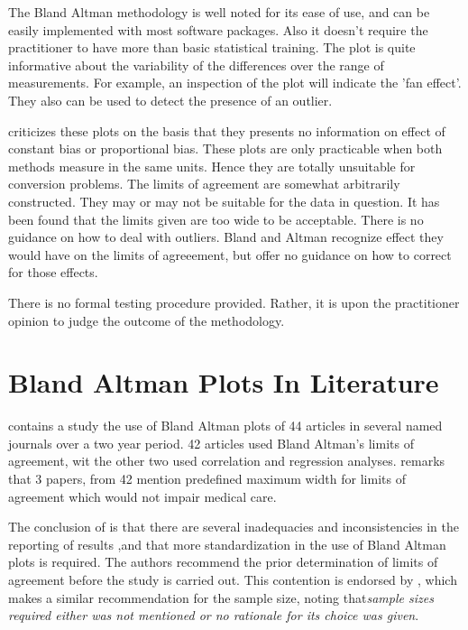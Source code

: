 \documentclass[Main.tex]{subfiles}
\begin{document}
The Bland Altman methodology is well noted for its ease of use,
and can be easily implemented with most software packages. Also it
doesn't require the practitioner to have more than basic
statistical training. The plot is quite informative about the
variability of the differences over the range of measurements. For
example, an inspection of the plot will indicate the 'fan effect'.
They also can be used to detect the presence of an outlier.

\citet{ludbrook97,ludbrook02}criticizes these plots on the
basis that they presents no information on effect of constant bias
or proportional bias. These plots are only practicable when both
methods measure in the same units. Hence they are totally
unsuitable for conversion problems. The limits of agreement are
somewhat arbitrarily constructed. They may or may not be suitable
for the data in question. It has been found that the limits given
are too wide to be acceptable. There is no guidance on how to deal
with outliers. Bland and Altman recognize effect they would have
on the limits of agreeement, but offer no guidance on how to
correct for those effects.

There is no formal testing procedure provided. Rather, it is upon
the practitioner opinion to judge the outcome of the methodology.











	\section{Bland Altman Plots In Literature}
	\citet{mantha} contains a study the use of Bland Altman plots of
	44 articles in several named journals over a two year period. 42
	articles used Bland Altman's limits of agreement, wit the other
	two used correlation and regression analyses. \citet{mantha}
	remarks that 3 papers, from 42 mention predefined maximum width
	for limits of agreement which would not impair medical care.
	
	The conclusion of \citet{mantha} is that there are several
	inadequacies and inconsistencies in the reporting of results ,and
	that more standardization in the use of Bland Altman plots is
	required. The authors recommend the prior determination of limits
	of agreement before the study is carried out. This contention is
	endorsed by \citet{lin}, which makes a similar recommendation for
	the sample size, noting that\emph{sample sizes required either was
		not mentioned or no rationale for its choice was given}.
	
\end{document}
